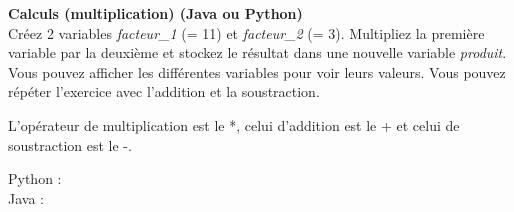 \begin{Exercice}[20 minutes] \textbf{Calculs (multiplication) (Java ou Python)}\\

   Créez 2 variables \textit{facteur\_1} (= 11) et \textit{facteur\_2} (= 3). Multipliez la première variable par la deuxième et stockez le résultat dans une nouvelle variable \textit{produit}. Vous pouvez afficher les différentes variables pour voir leurs valeurs. Vous pouvez répéter l'exercice avec l'addition et la soustraction. \\
   
    \begin{conseil}
      	L'opérateur de multiplication est le *, celui d'addition est le + et celui de soustraction est le -.
        
    \end{conseil}
    \begin{solution}
    
    Python : \\
    
    
    
    Java : \\
    
    
           
    \end{solution}   
\end{Exercice}

